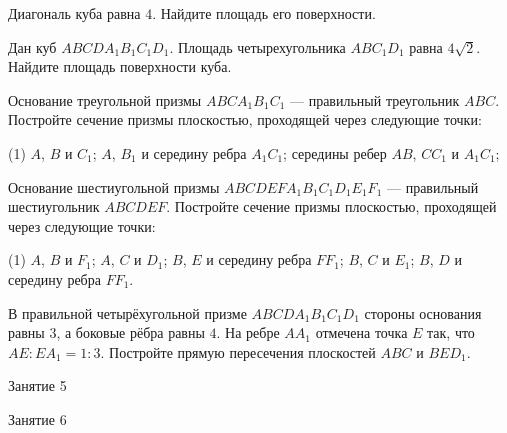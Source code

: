 \begin{class}[number=4]
	\begin{listofex}
		\item Диагональ куба равна \( 4 \). Найдите площадь его поверхности.
		\item Дан куб \( ABCDA_1B_1C_1D_1 \). Площадь четырехугольника \( ABC_1D_1 \) равна \( 4\sqrt{2} \). Найдите площадь поверхности куба.
		\item Основание треугольной призмы \( ABCA_1B_1C_1 \) ---
		правильный треугольник \( ABC \).
		Постройте сечение призмы плоскостью,
		проходящей через следующие точки:
		\begin{tasks}(1)
			\task \( A \), \( B \) и \( C_1 \);
			\task \( A \), \( B_1 \) и середину ребра \( A_1C_1 \);
			\task середины ребер \( AB \), \( CC_1 \) и \( A_1C_1 \);
		\end{tasks}
		\item Основание шестиугольной призмы \( ABCDEFA_1B_1C_1D_1E_1F_1 \) ---
		правильный шестиугольник \( ABCDEF \).
		Постройте сечение призмы плоскостью,
		проходящей через следующие точки:
		\begin{tasks}(1)
			\task \( A \), \( B \) и \( F_1 \);
			\task \( A \), \( C \) и \( D_1 \);
			\task \( B \), \( E \) и середину ребра \( FF_1 \);
			\task \( B \), \( C \) и \( E_1 \);
			\task \( B \), \( D \) и середину ребра \( FF_1 \).
		\end{tasks}
		\item В правильной четырёхугольной призме \(ABCDA_1B_1C_1D_1\) стороны основания равны \(3\), а боковые рёбра равны \(4\). На ребре \(AA_1\) отмечена точка \(E\) так, что \(AE :EA_1 = 1:3\). Постройте прямую пересечения плоскостей \(ABC\) и \(BED_1\).
	\end{listofex}
\end{class}

\begin{class}[number=5]
	\begin{listofex}
		\item Занятие 5
	\end{listofex}
\end{class}

\begin{class}[number=6]
	\begin{listofex}
		\item Занятие 6
	\end{listofex}
\end{class}

